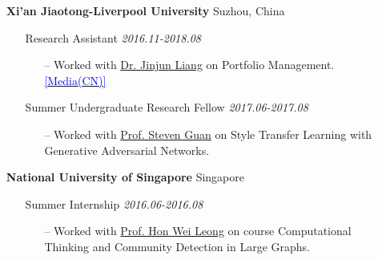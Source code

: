\documentclass[11pt]{article}
\begin{document}
\begin{itemize}[leftmargin=0em, noitemsep, nolistsep]
\begin{itemize}[noitemsep, nolistsep, leftmargin=0em]
\begin{itemize}
             \end{itemize}
        \end{itemize} 
    \item[] \large\textbf{Xi'an Jiaotong-Liverpool University} \hfill Suzhou, China
        \begin{itemize}[noitemsep, nolistsep, leftmargin=0em]
            \item[] Research Assistant \hfill \textit{2016.11-2018.08}
             \begin{itemize}
                \small
                \item[--] Worked with \href{https://www.linkedin.com/in/kumkee}{Dr. Jinjun Liang} on Portfolio Management. \href{https://archive.is/XKqY3}{\textcolor{blue}{[Media(CN)]}}
             \end{itemize}
            \item[] Summer Undergraduate Research Fellow \hfill \textit{2017.06-2017.08}
             \begin{itemize}
                \small
                \item[--] Worked with \href{https://www.xjtlu.edu.cn/en/departments/academic-departments/computer-science-and-software-engineering/staff/steven-guan}{Prof. Steven Guan} on Style Transfer Learning with Generative Adversarial Networks.
             \end{itemize}
        \end{itemize} 
    \item[] \large\textbf{National University of Singapore} \hfill Singapore
        \begin{itemize}[noitemsep, nolistsep, leftmargin=0em]
            \item[] Summer Internship \hfill \textit{2016.06-2016.08}
            \begin{itemize}
                \small
                \item[--] Worked with \href{https://www.comp.nus.edu.sg/~leonghw/}{Prof. Hon Wei Leong} on course Computational Thinking and Community Detection in Large Graphs.
            \end{itemize}
        \end{itemize} 
\end{itemize}
\end{document}
